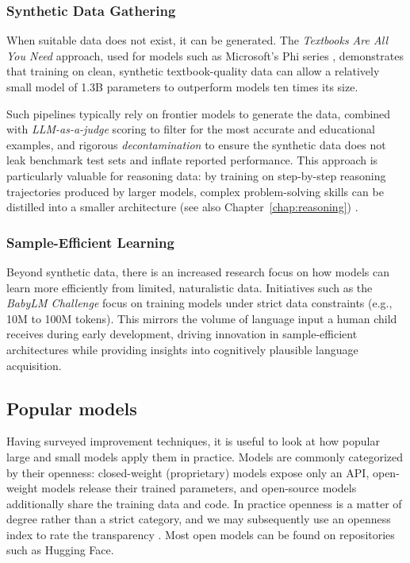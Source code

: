 \subsubsection{Synthetic Data Gathering}
When suitable data does not exist, it can be generated. The {\em Textbooks Are All You Need} approach, used for models such as Microsoft's Phi series \citep{gunasekar2024textbooks}, demonstrates that training on clean, synthetic textbook-quality data can allow a relatively small model of 1.3B parameters to outperform models ten times its size. 

Such pipelines typically rely on frontier models to generate the data, combined with {\em LLM-as-a-judge} scoring to filter for the most accurate and educational examples, and rigorous \emph{decontamination} to ensure the synthetic data does not leak benchmark test sets and inflate reported performance. This approach is particularly valuable for reasoning data: by training on step-by-step reasoning trajectories produced by larger models, complex problem-solving skills can be distilled into a smaller architecture (see also Chapter~\ref{chap:reasoning}) \citep{muennighoff2025s1, arora2026training}.

\subsubsection{Sample-Efficient Learning}
Beyond synthetic data, there is an increased research focus on how models can learn more efficiently from limited, naturalistic data. Initiatives such as the \emph{BabyLM Challenge} \citep{warstadt-etal-2023-findings} focus on training models under strict data constraints (e.g., 10M to 100M tokens). This mirrors the volume of language input a human child receives during early development, driving innovation in sample-efficient architectures while providing insights into cognitively plausible language acquisition.

\subsection{Popular models}
Having surveyed  improvement techniques, it is useful to look at how popular large and small models apply them in practice. Models are commonly categorized by their openness: closed-weight (proprietary) models expose only an API, open-weight models release their trained parameters, and open-source models additionally share the training data and code. In practice openness is a matter of degree rather than a strict category, and we may subsequently use an openness index to rate the transparency \citep{artificialanalysis_openness}. Most open models can be found on repositories such as Hugging Face.


